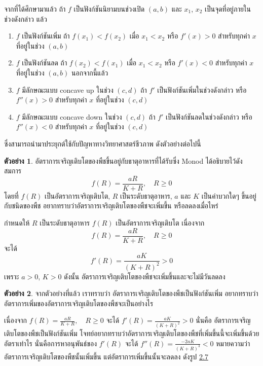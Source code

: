 \documentclass[
]{book}
\theoremstyle{definition}
\theoremstyle{definition}
\newtheorem{example}{ตัวอย่าง}[chapter]
\theoremstyle{definition}
\theoremstyle{definition}
\theoremstyle{remark}
\begin{document}
จากที่ได้ศึกษามาแล้ว ถ้า \(f\) เป็นฟังก์ชันนิยามบนช่วงเปิด \((a,b)\) และ \(x_1\), \(x_2\)
เป็นจุดที่อยู่ภายในช่วงดังกล่าว แล้ว

\begin{enumerate}
\def\labelenumi{(\arabic{enumi})}
\item
  \(f\) เป็นฟังก์ชันเพิ่ม ถ้า \(f(x_1)<f(x_2)\) เมื่อ \(x_1<x_2\) หรือ \(f'(x)>0\)
  สำหรับทุกค่า \(x\) ที่อยู่ในช่วง \((a,b)\)
\item
  \(f\) เป็นฟังก์ชันลด ถ้า \(f(x_2)<f(x_1)\) เมื่อ \(x_1<x_2\) หรือ \(f'(x)<0\)
  สำหรับทุกค่า \(x\) ที่อยู่ในช่วง \((a,b)\) นอกจากนี้แล้ว
\item
  \(f\) มีลักษณะแบบ concave up ในช่วง \((c,d)\) ถ้า \(f'\)
  เป็นฟังก์ชันเพิ่มในช่วงดังกล่าว หรือ \(f''(x)>0\) สำหรับทุกค่า \(x\) ที่อยู่ในช่วง \((c,d)\)
\item
  \(f\) มีลักษณะแบบ concave down ในช่วง \((c,d)\) ถ้า \(f'\)
  เป็นฟังก์ชันลดในช่วงดังกล่าว หรือ \(f''(x)<0\) สำหรับทุกค่า \(x\) ที่อยู่ในช่วง \((c,d)\)
\end{enumerate}

ซึ่งสามารถนำมาประยุกต์ใช้กับปัญหาทางวิทยาศาสตร์ชีวภาพ ดังตัวอย่างต่อไปนี้

\begin{example}
อัตราการเจริญเติบโตของพืชขึ้นอยู่กับธาตุอาหารที่ได้รับซึ่ง Monod ได้อธิบายไว้ดังสมการ
\[f(R)=\frac{aR}{K+R}, \quad R \ge 0\] โดยที่ \(f(R)\) เป็นอัตราการเจริญเติบโต,
\(R\) เป็นระดับธาตุอาหาร, \(a\) และ \(K\) เป็นค่าบวกใดๆ ขึ้นอยู่กับชนิดของพืช
อยากทราบว่าอัตราการเจริญเติบโตของพืชจะเพิ่มขึ้น หรือลดลงเมื่อไหร่
\end{example}

กำหนดให้ \(R\) เป็นระดับธาตุอาหาร \(f(R)\) เป็นอัตราการเจริญเติบโต เนื่องจาก
\[f(R)=\frac{aR}{K+R},  \quad      R \ge 0\] จะได้
\[f'(R)=\frac{aK}{(K+R)^2}>0\] เพราะ \(a>0\), \(K>0\) ดังนั้น
อัตราการเจริญเติบโตของพืชจะเพิ่มขึ้นและจะไม่มีวันลดลง

\begin{example}
จากตัวอย่างที่แล้ว เราทราบว่า อัตราการเจริญเติบโตของพืชเป็นฟังก์ชันเพิ่ม
อยากทราบว่าอัตราการเพิ่มของอัตราการเจริญเติบโตของพืชจะเป็นอย่างไร
\end{example}

เนื่องจาก \(\displaystyle f(R)=\frac{aR}{K+R}, \quad R \ge 0\) จะได้
\(\displaystyle f'(R)=\frac{aK}{(K+R)^2}>0\) นั่นคือ
อัตราการเจริญเติบโตของพืชเป็นฟังก์ชันเพิ่ม
โจทย์อยากทราบว่าอัตราการเจริญเติบโตของพืชที่เพิ่มขึ้นนี้จะเพิ่มขึ้นด้วยอัตราเท่าไร
นั่นคือการหาอนุพันธ์ของ \(f'(R)\) จะได้
\(\displaystyle f''(R)=\frac{-2aK}{(K+R)^3}<0\)
หมายความว่าอัตราการเจริญเติบโตของพืชนั้นเพิ่มขึ้น แต่อัตราการเพิ่มขึ้นนั้นจะลดลง ดังรูป
\hyperref[fig-monod]{2.7}
\end{document}
